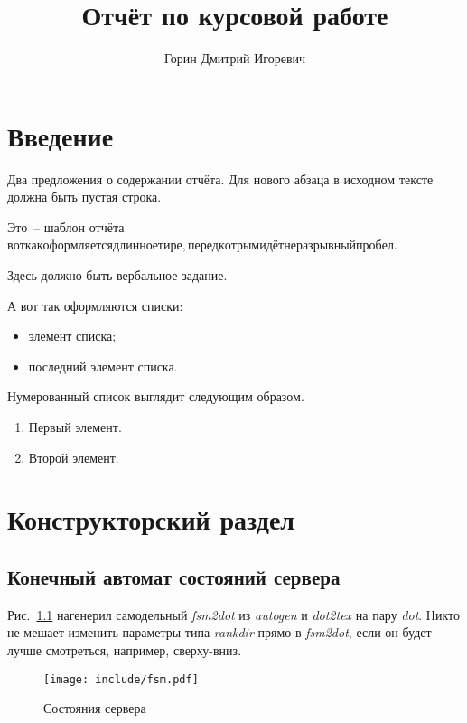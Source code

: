 \documentclass[a4paper,12pt]{report}
\title{Отчёт по курсовой работе}
\author{Горин Дмитрий Игоревич}
\begin{document}
\maketitle

\tableofcontents

\chapter*{Введение}

Два предложения о содержании отчёта. Для нового абзаца в исходном тексте должна быть пустая строка.

Это~-- шаблон отчёта \(вот как оформляется длинное тире, перед котрым идёт неразрывный пробел\).


Здесь должно быть вербальное задание.

А вот так оформляются списки:
\begin{itemize}
\item элемент списка;
\item последний элемент списка.
\end{itemize}

Нумерованный список выглядит следующим образом.
\begin{enumerate}
\item Первый элемент.
\item Второй элемент.
\end{enumerate}


\chapter{Конструкторский раздел}

\section{Конечный автомат состояний сервера}

Рис.~\ref{fig:fsm} нагенерил самодельный \textit{fsm2dot} из \textit{autogen} и \textit{dot2tex} на пару \textit{dot}. Никто не мешает изменить параметры типа \textit{rankdir} прямо в \textit{fsm2dot}, если он будет лучше смотреться, например, сверху-вниз.

\begin{figure}
\centering
\texttt{[image: include/fsm.pdf]}
\caption{Состояния сервера}
\label{fig:fsm}
\end{figure}
\end{document}
